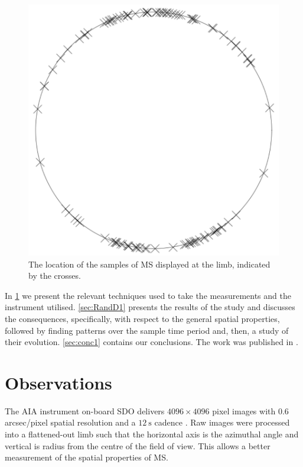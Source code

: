 \begin{figure}[h!]
	\centering
	\includegraphics[scale=0.3]{Chapter3/Figs/polar_demo}
	\caption{\small The location of the samples of MS displayed at the limb, indicated by the crosses.}
	\label{fig:polar-sample}
\end{figure}


In \cref{sec:obs1} we present the relevant techniques used to take the measurements and the instrument utilised. \cref{sec:RandD1} presents the results of the study and discusses the consequences, specifically, with respect to the general spatial properties, followed by finding patterns over the sample time period and, then, a study of their evolution. \cref{sec:conc1} contains our conclusions. The work was published in \cite{Bennett2015}.


\section{Observations}
\label{sec:obs1}   
The AIA instrument on-board SDO delivers $4096 \times 4096$ pixel images with $0.6$ arcsec/pixel spatial resolution and a $12\ \textrm{s}$ cadence \cite{AIAspec}. Raw images were processed into a flattened-out limb such that the horizontal axis is the azimuthal angle and vertical is radius from the centre of the field of view. This allows a better measurement of the spatial properties of MS.



